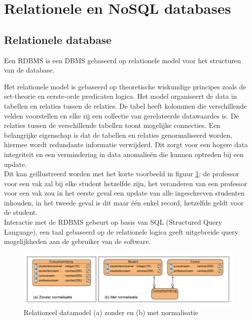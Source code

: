 \section{Relationele en NoSQL databases} 
\subsection{Relationele database}
Een RDBMS is een DBMS gebaseerd op relationele model voor het structuren van de database.

Het relationele model is gebaseerd op theoretische wiskundige principes zoals de set-theorie en eerste-orde predicaten logica. Het model organiseert de data in tabellen en relaties tussen de relaties. De tabel heeft kolommen die verschillende velden voorstellen en elke rij een collectie van gerelateerde datawaardes is. De relaties tussen de verschillende tabellen toont mogelijke connecties. Een belangrijke eigenschap is dat de tabellen en relaties genormaliseerd worden, hiermee wordt redundante informatie verwijderd. Dit zorgt voor een hogere data integriteit en een vermindering in data anomalieën die kunnen optreden bij een update.\cite{Elmasri:2010:FDS:1855347} \\
Dit kan geïllustreerd worden met het korte voorbeeld in figuur \ref{fig:Relationeel-Model-Normalisatie}: de professor voor een vak zal bij elke student hetzelfde zijn, het veranderen van een professor voor een vak zou in het eerste geval een update van alle ingeschreven studenten inhouden, in het tweede geval is dit maar één enkel record, hetzelfde geldt voor de student. \\
Interactie met de RDBMS gebeurt op basis van SQL (Structured Query Language), een taal gebaseerd op de relationele logica geeft uitgebreide query mogelijkheden aan de gebruiker van de software.   
\begin{figure}[h!]
\centering
\includegraphics[width=\linewidth]{img/Relationeel-Model-Normalisatie.png}
\caption[Relationeel datamodel (a) zonder en (b) met normalisatie]{Relationeel datamodel (a) zonder en (b) met normalisatie}
\label{fig:Relationeel-Model-Normalisatie}
\end{figure}

